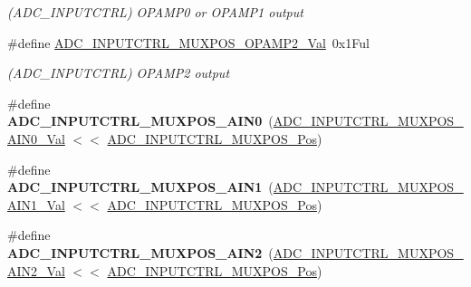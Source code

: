 \begin{DoxyCompactItemize}
\begin{DoxyCompactList}\small\item\em (A\+D\+C\+\_\+\+I\+N\+P\+U\+T\+C\+T\+R\+L) O\+P\+A\+M\+P0 or O\+P\+A\+M\+P1 output \end{DoxyCompactList}\item 
\hypertarget{group___s_a_m_l21___a_d_c_ga001273137332d8cb5901e4fece2cadf8}{}\#define \hyperlink{group___s_a_m_l21___a_d_c_ga001273137332d8cb5901e4fece2cadf8}{A\+D\+C\+\_\+\+I\+N\+P\+U\+T\+C\+T\+R\+L\+\_\+\+M\+U\+X\+P\+O\+S\+\_\+\+O\+P\+A\+M\+P2\+\_\+\+Val}~0x1\+Ful\label{group___s_a_m_l21___a_d_c_ga001273137332d8cb5901e4fece2cadf8}

\begin{DoxyCompactList}\small\item\em (A\+D\+C\+\_\+\+I\+N\+P\+U\+T\+C\+T\+R\+L) O\+P\+A\+M\+P2 output \end{DoxyCompactList}\item 
\hypertarget{group___s_a_m_l21___a_d_c_gadbc218dad05afc658945673ebea6d024}{}\#define {\bfseries A\+D\+C\+\_\+\+I\+N\+P\+U\+T\+C\+T\+R\+L\+\_\+\+M\+U\+X\+P\+O\+S\+\_\+\+A\+I\+N0}~(\hyperlink{group___s_a_m_l21___a_d_c_ga435301c77fea1abf66a3b77a1150cfbe}{A\+D\+C\+\_\+\+I\+N\+P\+U\+T\+C\+T\+R\+L\+\_\+\+M\+U\+X\+P\+O\+S\+\_\+\+A\+I\+N0\+\_\+\+Val} $<$$<$ \hyperlink{group___s_a_m_l21___a_d_c_ga583868be285e1c06c9a93dfd552d8c6a}{A\+D\+C\+\_\+\+I\+N\+P\+U\+T\+C\+T\+R\+L\+\_\+\+M\+U\+X\+P\+O\+S\+\_\+\+Pos})\label{group___s_a_m_l21___a_d_c_gadbc218dad05afc658945673ebea6d024}

\item 
\hypertarget{group___s_a_m_l21___a_d_c_ga5d1cd10b18cf1bbe61aa2b5c1c43bf9b}{}\#define {\bfseries A\+D\+C\+\_\+\+I\+N\+P\+U\+T\+C\+T\+R\+L\+\_\+\+M\+U\+X\+P\+O\+S\+\_\+\+A\+I\+N1}~(\hyperlink{group___s_a_m_l21___a_d_c_ga2687e7ffb68e6da887146f2c62c18f6b}{A\+D\+C\+\_\+\+I\+N\+P\+U\+T\+C\+T\+R\+L\+\_\+\+M\+U\+X\+P\+O\+S\+\_\+\+A\+I\+N1\+\_\+\+Val} $<$$<$ \hyperlink{group___s_a_m_l21___a_d_c_ga583868be285e1c06c9a93dfd552d8c6a}{A\+D\+C\+\_\+\+I\+N\+P\+U\+T\+C\+T\+R\+L\+\_\+\+M\+U\+X\+P\+O\+S\+\_\+\+Pos})\label{group___s_a_m_l21___a_d_c_ga5d1cd10b18cf1bbe61aa2b5c1c43bf9b}

\item 
\hypertarget{group___s_a_m_l21___a_d_c_ga98c19c2618424403490764d042a00be1}{}\#define {\bfseries A\+D\+C\+\_\+\+I\+N\+P\+U\+T\+C\+T\+R\+L\+\_\+\+M\+U\+X\+P\+O\+S\+\_\+\+A\+I\+N2}~(\hyperlink{group___s_a_m_l21___a_d_c_gacc4be6c554e9992353f7cfc97612ad3c}{A\+D\+C\+\_\+\+I\+N\+P\+U\+T\+C\+T\+R\+L\+\_\+\+M\+U\+X\+P\+O\+S\+\_\+\+A\+I\+N2\+\_\+\+Val} $<$$<$ \hyperlink{group___s_a_m_l21___a_d_c_ga583868be285e1c06c9a93dfd552d8c6a}{A\+D\+C\+\_\+\+I\+N\+P\+U\+T\+C\+T\+R\+L\+\_\+\+M\+U\+X\+P\+O\+S\+\_\+\+Pos})\label{group___s_a_m_l21___a_d_c_ga98c19c2618424403490764d042a00be1}


\end{DoxyCompactItemize}
